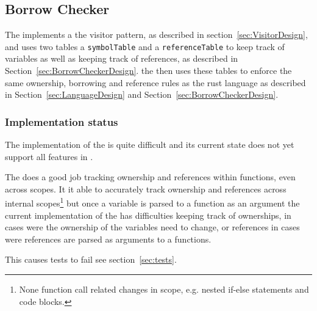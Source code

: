 \subsection{Borrow Checker}
\label{sec:BorrowCheckerImpl}

The \borrowChecker{} implements a the visitor pattern, as described in
section~\ref{sec:VisitorDesign}, and uses two tables a
\texttt{symbolTable} and a \texttt{referenceTable} to keep track of variables as well
as keeping track of references, as described in
Section~\ref{sec:BorrowCheckerDesign}. the \borrowChecker then uses these tables to enforce the
same ownership, borrowing and reference rules as the rust language as described
in Section~\ref{sec:LanguageDesign} and Section~\ref{sec:BorrowCheckerDesign}. 

\subsubsection{Implementation status}

The implementation of the \borrowChecker{} is quite difficult and its current state
does not yet support all features in \lang{}. 

The \borrowChecker{} does a good job tracking ownership and references within
functions, even across scopes. It it able to accurately track ownership and
references across internal scopes\footnote{None function call related changes in
scope, e.g. nested if-else statements and code blocks.} but once a variable is parsed
to a function as an argument the current implementation of the \borrowChecker{} has
difficulties keeping track of ownerships, in cases were the ownership of the
variables need to change, or references in cases were references are parsed as
arguments to a functions.

This causes tests to fail see section~\ref{sec:tests}.
